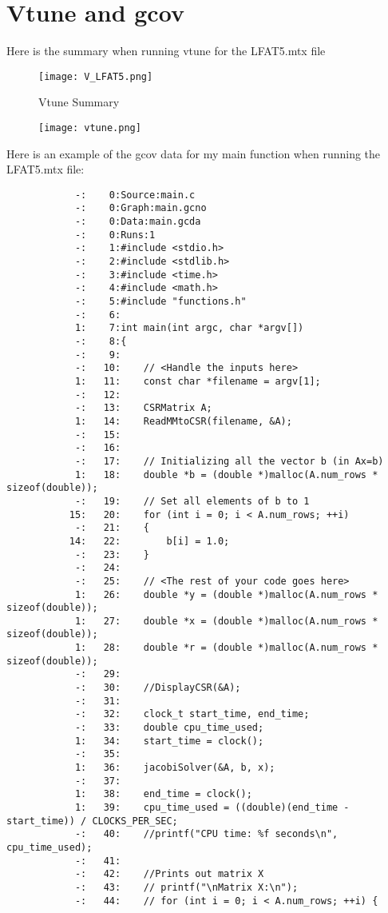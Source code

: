 \documentclass[12pt]{article}
\begin{document}
	\section{Vtune and gcov}

	Here is the summary when running vtune for the LFAT5.mtx file
	\begin{figure}[H]
		\caption{Vtune Summary}
		\centering
		\texttt{[image: V\_LFAT5.png]}
	\end{figure}

	\begin{figure}[H]
		\centering
		\texttt{[image: vtune.png]}
	\end{figure}

	Here is an example of the gcov data for my main function when running the LFAT5.mtx file:
	\begin{mdframed}[style=myboxstyleTerminal1]
		\begin{verbatim}
			-:    0:Source:main.c
			-:    0:Graph:main.gcno
			-:    0:Data:main.gcda
			-:    0:Runs:1
			-:    1:#include <stdio.h>
			-:    2:#include <stdlib.h>
			-:    3:#include <time.h>
			-:    4:#include <math.h>
			-:    5:#include "functions.h"
			-:    6:
			1:    7:int main(int argc, char *argv[])
			-:    8:{
			-:    9:
			-:   10:    // <Handle the inputs here>
			1:   11:    const char *filename = argv[1];
			-:   12:
			-:   13:    CSRMatrix A;
			1:   14:    ReadMMtoCSR(filename, &A);
			-:   15:    
			-:   16:
			-:   17:    // Initializing all the vector b (in Ax=b)
			1:   18:    double *b = (double *)malloc(A.num_rows * sizeof(double));
			-:   19:    // Set all elements of b to 1
		   15:   20:    for (int i = 0; i < A.num_rows; ++i)
			-:   21:    {
		   14:   22:        b[i] = 1.0;
			-:   23:    }
			-:   24:
			-:   25:    // <The rest of your code goes here>
			1:   26:    double *y = (double *)malloc(A.num_rows * sizeof(double));
			1:   27:    double *x = (double *)malloc(A.num_rows * sizeof(double));
			1:   28:    double *r = (double *)malloc(A.num_rows * sizeof(double));
			-:   29:
			-:   30:    //DisplayCSR(&A);
			-:   31:    
			-:   32:    clock_t start_time, end_time;
			-:   33:    double cpu_time_used;
			1:   34:    start_time = clock();
			-:   35:
			1:   36:    jacobiSolver(&A, b, x);
			-:   37:
			1:   38:    end_time = clock();
			1:   39:    cpu_time_used = ((double)(end_time - start_time)) / CLOCKS_PER_SEC;
			-:   40:    //printf("CPU time: %f seconds\n", cpu_time_used);
			-:   41:
			-:   42:    //Prints out matrix X
			-:   43:    // printf("\nMatrix X:\n");
			-:   44:    // for (int i = 0; i < A.num_rows; ++i) {

\end{verbatim}
\end{mdframed}
\end{document}
